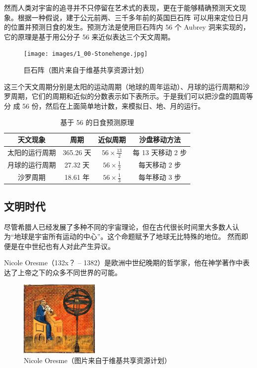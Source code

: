 \documentclass[a4paper,10.5pt]{article}
\begin{document}
然而人类对宇宙的追寻并不只停留在艺术式的表现，更在于能够精确预测天文现象。根据一种假说，建于公元前两、三千多年前的英国巨石阵
可以用来定位日月的位置并预测日食的发生。预测方法是使用巨石阵内 56 个 Aubrey 洞来实现的，它的原理是基于用公分子 56 来近似表达三个天文周期。

\begin{figure}[ht]
\centering
\texttt{[image: images/1\_00-Stonehenge.jpg]}
\caption{巨石阵（图片来自于维基共享资源计划）}
\end{figure}

这三个天文周期分别是太阳的运动周期（地球的周年运动）、月球的运行周期和沙罗周期，它们的周期和近似的分数表示如下表所示。于是我们可以把沙盘的圆周等分
成 56 份，然后在上面简单地计数，来模拟日、地、月的运行。

\begin{table}[tbhp]
\centering
\begin{tabular}{|c|c|c|c|}
\hline
天文现象 & 周期 & 近似周期 & 沙盘移动方法 \\
\hline
太阳的运行周期 & 365.26 天 & $ 56 \times \frac{13}{2} $ & 每 13 天移动 2 步 \\
\hline
月球的运行周期 & 27.32 天 & $ 56 \times \frac{1}{2} $  & 每天移动 2 步 \\
\hline
沙罗周期 & 18.61 年 & $ 56 \times \frac{1}{3} $  & 每年移动 3 步 \\
\hline
\end{tabular}
\caption{基于 56 的日食预测原理}
\end{table}

\newpage

\subsection{文明时代}

尽管希腊人已经发展了多种不同的宇宙理论，但在古代很长时间里大多数人认为“地球是宇宙所有运动的中心”。这个命题赋予了地球无比特殊的地位。
然而即便是在中世纪也有人对此产生异议。

Nicole Oresme（132x？ – 1382）是欧洲中世纪晚期的哲学家，他在神学著作中表达了上帝之下的众多不同世界的可能。

\begin{figure}[ht]
\centering
\includegraphics[width=1.5in]{images/1_02-Oresme.jpg}
\caption{Nicole Oresme（图片来自于维基共享资源计划）}
\end{figure}
\end{document}
